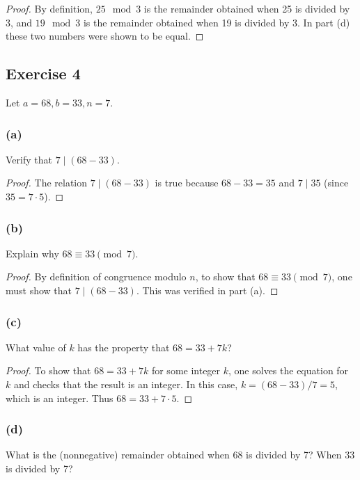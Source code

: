 \documentclass[14pt]{extarticle}
\begin{document}
\begin{proof}
        By definition, \(25 \mod 3\) is the remainder obtained when 25 is divided by 3, and \(19 \mod 3\) is the remainder
        obtained when 19 is divided by 3. In part (d) these two numbers were shown to be equal.
\end{proof}

\subsection{Exercise 4}
Let \(a = 68, b = 33, n = 7\).

\subsubsection{(a)}
Verify that \(7 \mid (68 - 33)\).

\begin{proof}
        The relation \(7 \mid (68 - 33)\) is true because \(68 - 33 = 35\) and \(7 \mid 35\) (since \(35 = 7 \cdot 5\)).
\end{proof}

\subsubsection{(b)}
Explain why \(68 \equiv 33 \pmod 7\).

\begin{proof}
        By definition of congruence modulo \(n\), to show that \(68 \equiv 33 \pmod 7\), one must show that \(7 \mid (68-33)\).
        This was verified in part (a).
\end{proof}

\subsubsection{(c)}
What value of $k$ has the property that \(68 = 33 + 7k\)?

\begin{proof}
        To show that \(68 = 33 + 7k\) for some integer \(k\), one solves the equation for \(k\) and checks that the result is
        an integer. In this case, \(k = (68 - 33)/7 = 5\), which is an integer. Thus \(68 = 33 + 7 \cdot 5\).
\end{proof}

\subsubsection{(d)}
What is the (nonnegative) remainder obtained when 68 is divided by 7? When 33 is divided by 7?
\end{document}
